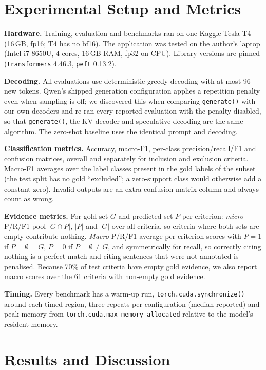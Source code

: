 \documentclass[conference]{IEEEtran}
\begin{document}
\section{Experimental Setup and Metrics}
\textbf{Hardware.} Training, evaluation and benchmarks ran on one Kaggle Tesla T4 (16\,GB, fp16; T4 has no bf16). The application was tested on the author's laptop (Intel i7-8650U, 4 cores, 16\,GB RAM, fp32 on CPU). Library versions are pinned (\texttt{transformers} 4.46.3, \texttt{peft} 0.13.2).

\textbf{Decoding.} All evaluations use deterministic greedy decoding with at most 96 new tokens. Qwen's shipped generation configuration applies a repetition penalty even when sampling is off; we discovered this when comparing \texttt{generate()} with our own decoders and re-ran every reported evaluation with the penalty disabled, so that \texttt{generate()}, the KV decoder and speculative decoding are the same algorithm. The zero-shot baseline uses the identical prompt and decoding.

\textbf{Classification metrics.} Accuracy, macro-F1, per-class precision/recall/F1 and confusion matrices, overall and separately for inclusion and exclusion criteria. Macro-F1 averages over the label classes present in the gold labels of the subset (the test split has no gold ``excluded''; a zero-support class would otherwise add a constant zero). Invalid outputs are an extra confusion-matrix column and always count as wrong.

\textbf{Evidence metrics.} For gold set $G$ and predicted set $P$ per criterion: \emph{micro} P/R/F1 pool $|G\cap P|$, $|P|$ and $|G|$ over all criteria, so criteria where both sets are empty contribute nothing. \emph{Macro} P/R/F1 average per-criterion scores with $P{=}1$ if $P{=}\emptyset{=}G$, $P{=}0$ if $P{=}\emptyset\neq G$, and symmetrically for recall, so correctly citing nothing is a perfect match and citing sentences that were not annotated is penalised. Because 70\% of test criteria have empty gold evidence, we also report macro scores over the 61 criteria with non-empty gold evidence.

\textbf{Timing.} Every benchmark has a warm-up run, \texttt{torch.cuda.synchronize()} around each timed region, three repeats per configuration (median reported) and peak memory from \texttt{torch.cuda.max\_memory\_allocated} relative to the model's resident memory.

\section{Results and Discussion}
\label{sec:results}
\end{document}
